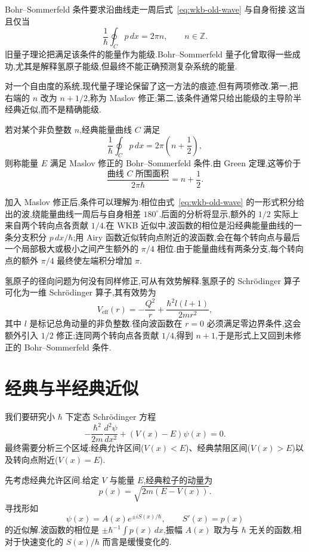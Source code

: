 Bohr--Sommerfeld 条件要求沿曲线走一周后式~\eqref{eq:wkb-old-wave} 与自身衔接.这当且仅当
\[
\frac1\hbar\oint_Cp\,dx=2\pi n,
\qquad n\in\mathbb Z.
\label{eq:bohr-sommerfeld-old}
\]
旧量子理论把满足该条件的能量作为能级.Bohr--Sommerfeld 量子化曾取得一些成功,尤其是解释氢原子能级,但最终不能正确预测复杂系统的能量.

对一个自由度的系统,现代量子理论保留了这一方法的痕迹,但有两项修改.第一,把右端的 $n$ 改为 $n+1/2$,称为 Maslov 修正;第二,该条件通常只给出能级的主导阶半经典近似,而不是精确能级.

\begin{definition}\label{condition:maslov-bohr-sommerfeld}
若对某个非负整数 $n$,经典能量曲线 $C$ 满足
\[
\frac1\hbar\oint_Cp\,dx=2\pi\left(n+\frac12\right),
\label{eq:maslov-bohr-sommerfeld}
\]
则称能量 $E$ 满足 Maslov 修正的 Bohr--Sommerfeld 条件.由 Green 定理,这等价于
\[
\frac{\text{曲线 }C\text{ 所围面积}}{2\pi\hbar}=n+\frac12.
\]
\end{definition}

加入 Maslov 修正后,条件可以理解为:相位由式~\eqref{eq:wkb-old-wave} 的一形式积分给出的波,绕能量曲线一周后与自身相差 $180^\circ$.后面的分析将显示,额外的 $1/2$ 实际上来自两个转向点各贡献 $1/4$.在 WKB 近似中,波函数的相位是沿经典能量曲线的一条分支积分 $p\,dx/\hbar$;用 Airy 函数近似转向点附近的波函数,会在每个转向点与最后一个局部极大或极小之间产生额外的 $\pi/4$ 相位.由于能量曲线有两条分支,每个转向点的额外 $\pi/4$ 最终使左端积分增加 $\pi$.

氢原子的径向问题为何没有同样修正,可从有效势解释.氢原子的 Schrödinger 算子可化为一维 Schrödinger 算子,其有效势为
\[
V_{\mathrm{eff}}(r)=-\frac{Q^2}{r}+\frac{\hbar^2l(l+1)}{2mr^2},
\]
其中 $l$ 是标记总角动量的非负整数.径向波函数在 $r=0$ 必须满足零边界条件,这会额外引入 $1/2$ 修正;连同两个转向点各贡献 $1/4$,得到 $n+1$,于是形式上又回到未修正的 Bohr--Sommerfeld 条件.

\section{经典与半经典近似}
\label{sec:wkb-classical-semiclassical}

我们要研究小 $\hbar$ 下定态 Schrödinger 方程
\[
-\frac{\hbar^2}{2m}\frac{d^2\psi}{dx^2}+(V(x)-E)\psi(x)=0.
\label{eq:wkb-schrodinger}
\]
最终需要分析三个区域:经典允许区间($V(x)<E$)、经典禁阻区间($V(x)>E$)以及转向点附近($V(x)=E$).

先考虑经典允许区间.给定 $V$ 与能量 $E$,经典粒子的动量为
\[
p(x)=\sqrt{2m(E-V(x))}.
\]
寻找形如
\[
\psi(x)=A(x)e^{\pm iS(x)/\hbar},
\qquad S'(x)=p(x)
\label{eq:wkb-ansatz}
\]
的近似解.波函数的相位是 $\pm\hbar^{-1}\int p(x)\,dx$,振幅 $A(x)$ 取为与 $\hbar$ 无关的函数,相对于快速变化的 $S(x)/\hbar$ 而言是缓慢变化的.

